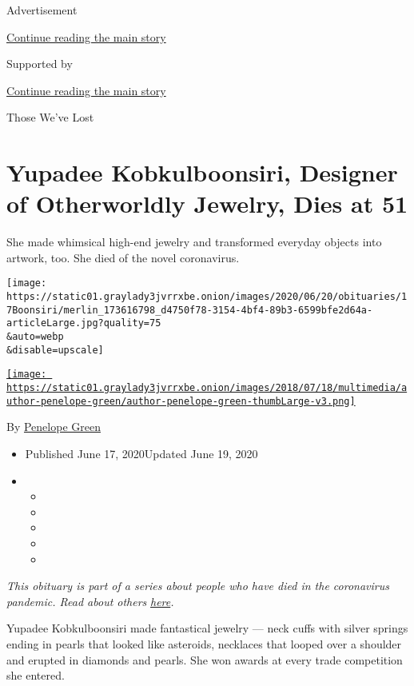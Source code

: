 Advertisement

\protect\hyperlink{after-top}{Continue reading the main story}

Supported by

\protect\hyperlink{after-sponsor}{Continue reading the main story}

Those We've Lost

\hypertarget{yupadee-kobkulboonsiri-designer-of-otherworldly-jewelry-dies-at-51}{%
\section{Yupadee Kobkulboonsiri, Designer of Otherworldly Jewelry, Dies
at
51}\label{yupadee-kobkulboonsiri-designer-of-otherworldly-jewelry-dies-at-51}}

She made whimsical high-end jewelry and transformed everyday objects
into artwork, too. She died of the novel coronavirus.

\texttt{[image: https://static01.graylady3jvrrxbe.onion/images/2020/06/20/obituaries/17Boonsiri/merlin\_173616798\_d4750f78-3154-4bf4-89b3-6599bfe2d64a-articleLarge.jpg?quality=75\\\&auto=webp\\\&disable=upscale]}

\href{https://www.nytimes3xbfgragh.onion/by/penelope-green}{\texttt{[image: https://static01.graylady3jvrrxbe.onion/images/2018/07/18/multimedia/author-penelope-green/author-penelope-green-thumbLarge-v3.png]}}

By \href{https://www.nytimes3xbfgragh.onion/by/penelope-green}{Penelope
Green}

\begin{itemize}
\item
  Published June 17, 2020Updated June 19, 2020
\item
  \begin{itemize}
  \item
  \item
  \item
  \item
  \item
  \end{itemize}
\end{itemize}

\emph{This obituary is part of a series about people who have died in
the coronavirus pandemic. Read about others}
\href{https://www.nytimes3xbfgragh.onion/interactive/2020/obituaries/people-died-coronavirus-obituaries.html}{\emph{here}}\emph{.}

Yupadee Kobkulboonsiri made fantastical jewelry --- neck cuffs with
silver springs ending in pearls that looked like asteroids, necklaces
that looped over a shoulder and erupted in diamonds and pearls. She won
awards at every trade competition she entered.

